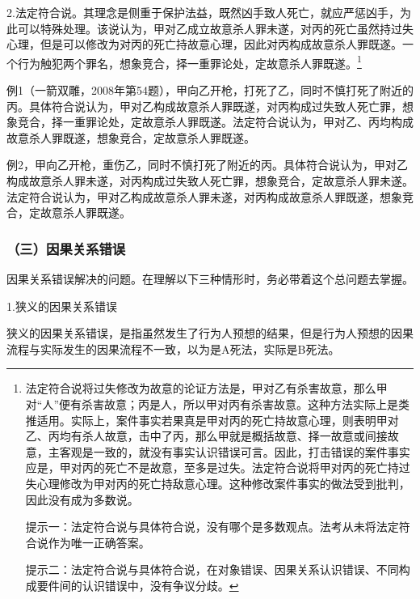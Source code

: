 2.法定符合说。其理念是侧重于保护法益，既然凶手致人死亡，就应严惩凶手，为此可以特殊处理。该说认为，甲对乙成立故意杀人罪未遂，对丙的死亡虽然持过失心理，但是可以修改为对丙的死亡持故意心理，因此对丙构成故意杀人罪既遂。一个行为触犯两个罪名，想象竞合，择一重罪论处，定故意杀人罪既遂。\footnote{法定符合说将过失修改为故意的论证方法是，甲对乙有杀害故意，那么甲对“人”便有杀害故意；丙是人，所以甲对丙有杀害故意。这种方法实际上是类推适用。实际上，案件事实若果真是甲对丙的死亡持故意心理，则表明甲对乙、丙均有杀人故意，击中了丙，那么甲就是概括故意、择一故意或间接故意，主客观是一致的，就没有事实认识错误可言。因此，打击错误的案件事实应是，甲对丙的死亡不是故意，至多是过失。法定符合说将甲对丙的死亡持过失心理修改为甲对丙的死亡持敌意心理。这种修改案件事实的做法受到批判，因此没有成为多数说。

提示一：法定符合说与具体符合说，没有哪个是多数观点。法考从未将法定符合说作为唯一正确答案。

提示二：法定符合说与具体符合说，在对象错误、因果关系认识错误、不同构成要件间的认识错误中，没有争议分歧。}

例1（一箭双雕，2008年第54题），甲向乙开枪，打死了乙，同时不慎打死了附近的丙。具体符合说认为，甲对乙构成故意杀人罪既遂，对丙构成过失致人死亡罪，想象竞合，择一重罪论处，定故意杀人罪既遂。法定符合说认为，甲对乙、丙均构成故意杀人罪既遂，想象竞合，定故意杀人罪既遂。

例2，甲向乙开枪，重伤乙，同时不慎打死了附近的丙。具体符合说认为，甲对乙构成故意杀人罪未遂，对丙构成过失致人死亡罪，想象竞合，定故意杀人罪未遂。法定符合说认为，甲对乙构成故意杀人罪未遂，对丙构成故意杀人罪既遂，想象竞合，定故意杀人罪既遂。

\subsubsection*{（三）因果关系错误}

因果关系错误解决的问题。在理解以下三种情形时，务必带着这个总问题去掌握。

1.狭义的因果关系错误

狭义的因果关系错误，是指虽然发生了行为人预想的结果，但是行为人预想的因果流程与实际发生的因果流程不一致，以为是A死法，实际是B死法。


